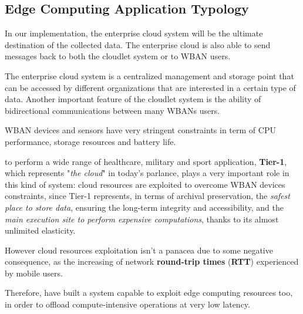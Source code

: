 \documentclass[sigchi]{acmart}
\begin{document}
\subsection{Edge Computing Application Typology}

\vspace{0.3cm}

\begin{quoting}[font=itshape, begintext={``}, endtext={''\cite[par.~3.2]{MSAReport}}]
In our implementation, the enterprise cloud system will be the ultimate destination of the collected data. The enterprise cloud is also able to send messages back to both the cloudlet system or to WBAN users.
\end{quoting}

\vspace{0.3cm}

\begin{quoting}[font=itshape, begintext={``}, endtext={''\cite[par.~4.1]{MSAReport}}]
The enterprise cloud system is a centralized management and storage point that can be accessed by different organizations that are interested in a certain type of data. Another important feature of the cloudlet system is the ability of bidirectional communications between many WBANs users.
\end{quoting}

\vspace{0.3cm}

WBAN devices and sensors have very stringent constraints in term of CPU performance, storage resources and battery life.

to perform a wide range of healthcare, military and sport application, \textbf{Tier-1}, which represents "\textit{the cloud}" in today's parlance, plays a very important role in this kind of system: cloud resources are exploited to overcome WBAN devices constraints, since Tier-1 represents, in terms of archival preservation, the \textit{safest place to store data}, ensuring the long-term integrity and accessibility, and the \textit{main execution site to perform expensive computations}, thanks to its almost unlimited elasticity. 

However cloud resources exploitation isn't a panacea due to some negative consequence, as the increasing of network \textbf{round-trip times} (\textbf{RTT}) experienced by mobile users. 

Therefore, \citet{MSAReport} have built a system capable to exploit edge computing resources too, in order to offload compute-intensive operations at very low latency.\cite{TheSeminalRoleEdgeNativeApplications}\cite{TheEmergenceOfEdgeComputing}
\end{document}
